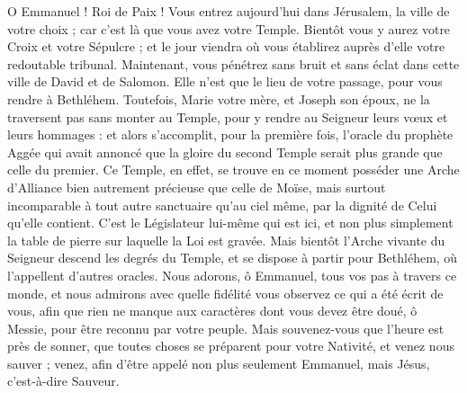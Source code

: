 \documentclass[%
fontsize=10%
,a6paper%
,DIV=13%
]{scrartcl}
\begin{document}
O Emmanuel ! Roi de Paix ! Vous entrez aujourd’hui dans Jérusalem, la ville de votre choix ; car c’est là que vous avez votre Temple. Bientôt vous y aurez votre Croix et votre Sépulcre ; et le jour viendra où vous établirez auprès d’elle votre redoutable tribunal. Maintenant, vous pénétrez sans bruit et sans éclat dans cette ville de David et de Salomon. Elle n’est que le lieu de votre passage, pour vous rendre à Bethléhem. Toutefois, Marie votre mère, et Joseph son époux, ne la traversent pas sans monter au Temple, pour y rendre au Seigneur leurs vœux et leurs hommages : et alors s’accomplit, pour la première fois, l’oracle du prophète Aggée qui avait annoncé que la gloire du second Temple serait plus grande que celle du premier. Ce Temple, en effet, se trouve en ce moment posséder une Arche d’Alliance bien autrement précieuse que celle de Moïse, mais surtout incomparable à tout autre sanctuaire qu’au ciel même, par la dignité de Celui qu’elle contient. C’est le Législateur lui-même qui est ici, et non plus simplement la table de pierre sur laquelle la Loi est gravée. Mais bientôt l’Arche vivante du Seigneur descend les degrés du Temple, et se dispose à partir pour Bethléhem, où l’appellent d’autres oracles. Nous adorons, ô Emmanuel, tous vos pas à travers ce monde, et nous admirons avec quelle fidélité vous observez ce qui a été écrit de vous, afin que rien ne manque aux caractères dont vous devez être doué, ô Messie, pour être reconnu par votre peuple. Mais souvenez-vous que l’heure est près de sonner, que toutes choses se préparent pour votre Nativité, et venez nous sauver ; venez, afin d’être appelé non plus seulement Emmanuel, mais Jésus, c’est-à-dire Sauveur.





\end{document}
